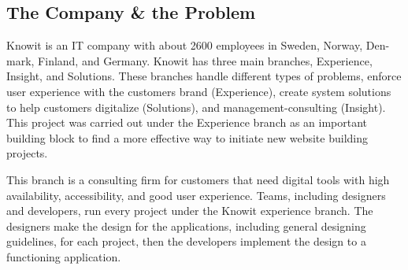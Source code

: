 

\subsection{The Company \& the Problem}
\label{sub:company}




Knowit is an IT company with about 2600 employees in Sweden, Norway, Den- mark, Finland, and Germany. Knowit has three main branches, Experience, Insight, and Solutions. These branches handle different types of problems, enforce user experience with the customers brand (Experience), create system solutions to help customers digitalize (Solutions), and management-consulting (Insight). This project was carried out under the Experience branch as an important building block to find a more effective way to initiate new website building projects. 

This branch is a consulting firm for customers that need digital tools with high availability, accessibility, and good user experience. Teams, including designers and developers, run every project under the Knowit experience branch. The designers make the design for the applications, including general designing guidelines, for each project, then the developers implement the design to a functioning application. 

